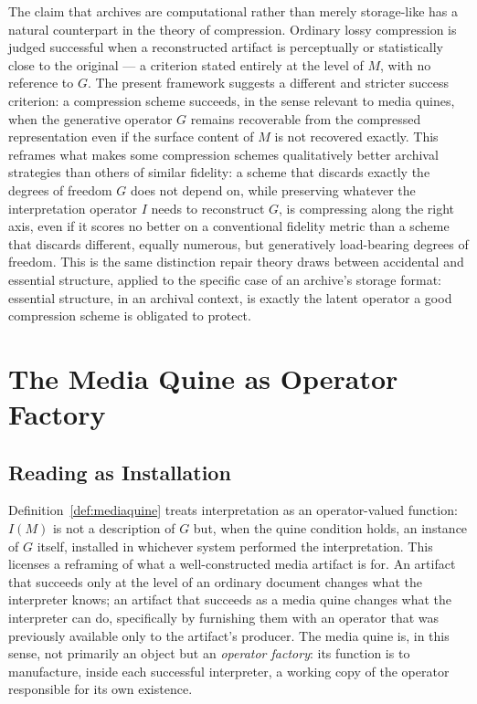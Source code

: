 \documentclass[11pt]{book}
\begin{document}
The claim that archives are computational rather than merely storage-like has a natural counterpart in the theory of compression. Ordinary lossy compression is judged successful when a reconstructed artifact is perceptually or statistically close to the original --- a criterion stated entirely at the level of $M$, with no reference to $G$. The present framework suggests a different and stricter success criterion: a compression scheme succeeds, in the sense relevant to media quines, when the generative operator $G$ remains recoverable from the compressed representation even if the surface content of $M$ is not recovered exactly. This reframes what makes some compression schemes qualitatively better archival strategies than others of similar fidelity: a scheme that discards exactly the degrees of freedom $G$ does not depend on, while preserving whatever the interpretation operator $I$ needs to reconstruct $G$, is compressing along the right axis, even if it scores no better on a conventional fidelity metric than a scheme that discards different, equally numerous, but generatively load-bearing degrees of freedom. This is the same distinction repair theory draws between accidental and essential structure, applied to the specific case of an archive's storage format: essential structure, in an archival context, is exactly the latent operator a good compression scheme is obligated to protect.

\chapter{The Media Quine as Operator Factory}
\label{ch:operatorfactory}

\section{Reading as Installation}

Definition~\ref{def:mediaquine} treats interpretation as an operator-valued function: $I(M)$ is not a description of $G$ but, when the quine condition holds, an instance of $G$ itself, installed in whichever system performed the interpretation. This licenses a reframing of what a well-constructed media artifact is for. An artifact that succeeds only at the level of an ordinary document changes what the interpreter knows; an artifact that succeeds as a media quine changes what the interpreter can do, specifically by furnishing them with an operator that was previously available only to the artifact's producer. The media quine is, in this sense, not primarily an object but an \emph{operator factory}: its function is to manufacture, inside each successful interpreter, a working copy of the operator responsible for its own existence.
\end{document}
